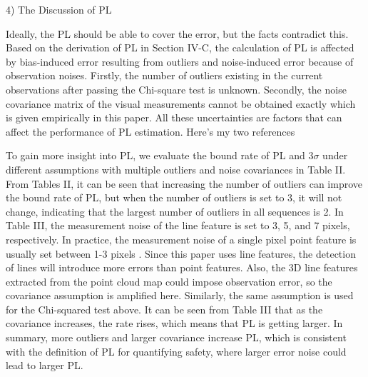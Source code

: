 \documentclass[10pt, letterpaper]{article}
\begin{document}
\begin{multicols*}{2}
4) The Discussion of PL


Ideally, the PL should be able to cover the error, but the facts
contradict this. Based on the derivation of PL in Section IV-C,
the calculation of PL is affected by bias-induced error resulting
from outliers and noise-induced error because of observation
noises. Firstly, the number of outliers existing in the current
observations after passing the Chi-square test is unknown.
Secondly, the noise covariance matrix of the visual
measurements cannot be obtained exactly which is given
empirically in this paper. All these uncertainties are factors that
can affect the performance of PL estimation.
\color{blue}Here's my two references \cite{pouliot2009linescout}\cite{zelazo2012rigidity}\color{black}

To gain more insight into PL, we evaluate the bound rate of
PL and 3$\sigma$ under different assumptions with multiple outliers
and noise covariances in Table II. From Tables II, it can be seen
that increasing the number of outliers can improve the bound
rate of PL, but when the number of outliers is set to 3, it will
not change, indicating that the largest number of outliers in all
sequences is 2. In Table III, the measurement noise of the line
feature is set to 3, 5, and 7 pixels, respectively. In practice, the
measurement noise of a single pixel point feature is usually set
between 1-3 pixels \cite{wu2015square}. Since this paper uses line features, the
detection of lines will introduce more errors than point features.
Also, the 3D line features extracted from the point cloud map
could impose observation error, so the covariance assumption
is amplified here. Similarly, the same assumption is used for the
Chi-squared test above. It can be seen from Table III that as the
covariance increases, the rate rises, which means that PL is
getting larger. In summary, more outliers and larger covariance
increase PL, which is consistent with the definition of PL for
quantifying safety, where larger error noise could lead to larger
PL.


\end{multicols*}
\end{document}
